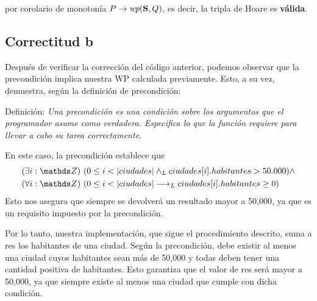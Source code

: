 \documentclass[10pt,a4paper]{article}
\begin{document}
por corolario de monotonía $P \Then \wp{S}{Q}$, es decir, la tripla de Hoare  es \textbf{válida}.

\pagebreak

\subsection{Correctitud b}
Después de verificar la corrección del código anterior, podemos observar que la precondición implica nuestra WP calculada previamente. Esto, a su vez, demuestra, según la definición de precondición:
\medskip

Definición: \textit{Una precondición es una condición sobre los argumentos que el programador asume como verdadera. Especifica lo que la función requiere para llevar a cabo su tarea correctamente.}
\medskip

En este caso, la precondición establece que
\begin{align*}
	 & \existe[unalinea]{i}{\ent}{0 \leq i < |ciudades| \yLuego ciudades[i].habitantes > 50.000} \land \\
	 & \paraTodo[unalinea]{i}{\ent}{0 \leq i < |ciudades| \implicaLuego ciudades[i].habitantes \geq 0}
\end{align*}
Esto nos asegura que siempre se devolverá un resultado mayor a 50,000, ya que es un requisito impuesto por la precondición.
\medskip

Por lo tanto, nuestra implementación, que sigue el procedimiento descrito, suma a res los habitantes de una ciudad. Según la precondición, debe existir al menos una ciudad cuyos habitantes sean más de 50,000 y todas deben tener una cantidad positiva de habitantes. Esto garantiza que el valor de res será mayor a 50,000, ya que siempre existe al menos una ciudad que cumple con dicha condición.
\end{document}
